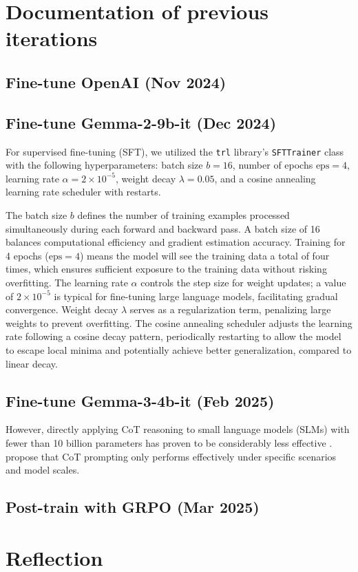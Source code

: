 
\section{Documentation of previous iterations} \label{app:previous-iterations}
\subsection{Fine-tune OpenAI (Nov 2024)} \label{app:openai-finetune}

\subsection{Fine-tune Gemma-2-9b-it (Dec 2024)} \label{app:gemma2-finetune}

For supervised fine-tuning (SFT), we utilized the \verb|trl| library's \verb|SFTTrainer| class with the following hyperparameters: batch size \( b = 16 \), number of epochs \( \text{eps} = 4 \), learning rate \( \alpha = 2 \times 10^{-5} \), weight decay \( \lambda = 0.05 \), and a cosine annealing learning rate scheduler with restarts.

The batch size \( b \) defines the number of training examples processed simultaneously during each forward and backward pass. A batch size of 16 balances computational efficiency and gradient estimation accuracy. Training for 4 epochs (\( \text{eps} = 4 \)) means the model will see the training data a total of four times, which ensures sufficient exposure to the training data without risking overfitting. The learning rate \( \alpha \) controls the step size for weight updates; a value of \( 2 \times 10^{-5} \) is typical for fine-tuning large language models, facilitating gradual convergence. Weight decay \( \lambda \) serves as a regularization term, penalizing large weights to prevent overfitting. The cosine annealing scheduler adjusts the learning rate following a cosine decay pattern, periodically restarting to allow the model to escape local minima and potentially achieve better generalization, compared to linear decay.

\subsection{Fine-tune Gemma-3-4b-it (Feb 2025)} \label{app:gemma3-finetune}

However, directly applying CoT reasoning to small language models (SLMs) with fewer than 10 billion parameters has proven to be considerably less effective \citep{hoLLMReasoningTeachers2023}. \citet{lanhamMeasuringFaithfulnessChainofThought2023} propose that CoT prompting only performs effectively under specific scenarios and model scales.

\subsection{Post-train \studentmodel with GRPO (Mar 2025)} \label{app:gemma3-grpo}

\section{Reflection} \label{sec:reflection}
